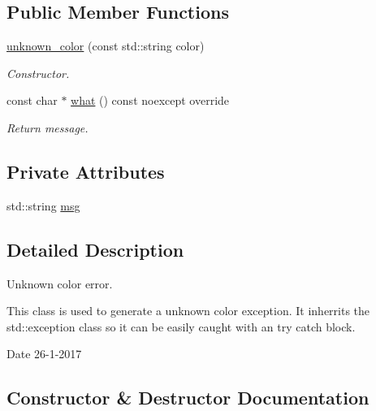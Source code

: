 \subsection*{Public Member Functions}
\begin{DoxyCompactItemize}
\item 
\hyperlink{classunknown__color_aef7c5513b511dd59ba1a3a58798966d3}{unknown\+\_\+color} (const std\+::string color)
\begin{DoxyCompactList}\small\item\em Constructor. \end{DoxyCompactList}\item 
const char $\ast$ \hyperlink{classunknown__color_a3340e3af5b5f734727b73ddf25df3265}{what} () const noexcept override
\begin{DoxyCompactList}\small\item\em Return message. \end{DoxyCompactList}\end{DoxyCompactItemize}
\subsection*{Private Attributes}
\begin{DoxyCompactItemize}
\item 
std\+::string \hyperlink{classunknown__color_a17bf517ff68841e8aac49dd58035c6a7}{msg}
\end{DoxyCompactItemize}


\subsection{Detailed Description}
Unknown color error. 

This class is used to generate a unknown color exception. It inherrits the std\+::exception class so it can be easily caught with an try catch block.

\begin{DoxyDate}{Date}
26-\/1-\/2017 
\end{DoxyDate}


\subsection{Constructor \& Destructor Documentation}
\mbox{\label{classunknown__color_aef7c5513b511dd59ba1a3a58798966d3}} 
